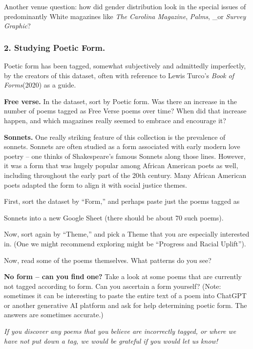 \documentclass[
  letterpaper,
  DIV=11,
  numbers=noendperiod]{scrartcl}
\begin{document}
Another venue question: how did gender distribution look in the special
issues of predominantly White magazines like \emph{The Carolina
Magazine}, \emph{Palms}, \_or \emph{Survey Graphic}?

\subsubsection{2. Studying Poetic Form.}\label{studying-poetic-form.}

Poetic form has been tagged, somewhat subjectively and admittedly
imperfectly, by the creators of this dataset, often with reference to
Lewis Turco's \emph{Book of Forms}(2020) as a guide.

\textbf{Free verse.} In the dataset, sort by Poetic form. Was there an
increase in the number of poems tagged as Free Verse poems over time?
When did that increase happen, and which magazines really seemed to
embrace and encourage it?

\textbf{Sonnets.} One really striking feature of this collection is the
prevalence of sonnets. Sonnets are often studied as a form associated
with early modern love poetry -- one thinks of Shakespeare's famous
Sonnets along those lines. However, it was a form that was hugely
popular among African American poets as well, including throughout the
early part of the 20th century. Many African American poets adapted the
form to align it with social justice themes.

First, sort the dataset by ``Form,'' and perhaps paste just the poems
tagged as

Sonnets into a new Google Sheet (there should be about 70 such poems).

Now, sort again by ``Theme,'' and pick a Theme that you are especially
interested in. (One we might recommend exploring might be ``Progress and
Racial Uplift'').

Now, read some of the poems themselves. What patterns do you see?

\textbf{No form -- can you find one?} Take a look at some poems that are
currently not tagged according to form. Can you ascertain a form
yourself? (Note: sometimes it can be interesting to paste the entire
text of a poem into ChatGPT or another generative AI platform and ask
for help determining poetic form. The answers are sometimes accurate.)

\emph{If you discover any poems that you believe are incorrectly tagged,
or where we have not put down a tag, we would be grateful if you would
let us know!}
\end{document}
